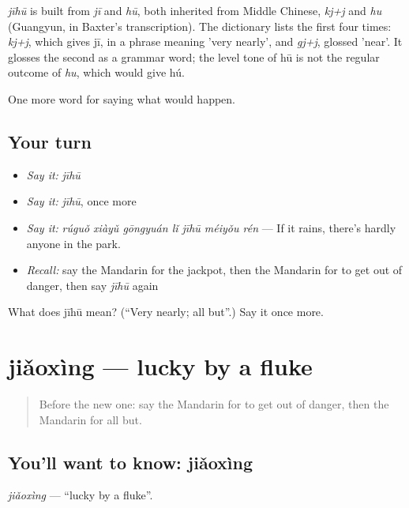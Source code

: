 \begin{cousinweb}
\emph{jīhū} is built from \emph{jī} and \emph{hū}, both inherited from Middle Chinese, \emph{kj+j} and \emph{hu} (Guangyun, in Baxter's transcription). The dictionary lists the first four times: \emph{kj+j}, which gives jī, in a phrase meaning 'very nearly', and \emph{gj+j}, glossed 'near'. It glosses the second as a grammar word; the level tone of hū is not the regular outcome of \emph{hu}, which would give hú.
\end{cousinweb}

\begin{grammarlens}[title={What you've built}]
One more word for saying what would happen.
\end{grammarlens}

\subsection*{Your turn}
\begin{itemize}
\raggedright
  \item \emph{Say it:} \emph{jīhū}
  \item \emph{Say it:} \emph{jīhū}, once more
  \item \emph{Say it:} \emph{rúguǒ xiàyǔ gōngyuán lǐ jīhū méiyǒu rén} — If it rains, there's hardly anyone in the park.
  \item \emph{Recall:} say the Mandarin for the jackpot, then the Mandarin for to get out of danger, then say \emph{jīhū} again
\end{itemize}

\begin{tcolorbox}[breakable,colback=teal!4,colframe=teal!35!black,title={Before you move on}]
What does jīhū mean? (\textquotedblleft{}Very nearly; all but\textquotedblright{}.) Say it once more.
\end{tcolorbox}
\section[jiǎoxìng]{jiǎoxìng — lucky by a fluke}

\label{lesson:ZH-C531-jiaoxing}



\begin{quote}
Before the new one: say the Mandarin for to get out of danger, then the Mandarin for all but.
\end{quote}

\subsection*{You'll want to know: jiǎoxìng}
\emph{jiǎoxìng} — \textquotedblleft{}lucky by a fluke\textquotedblright{}.

